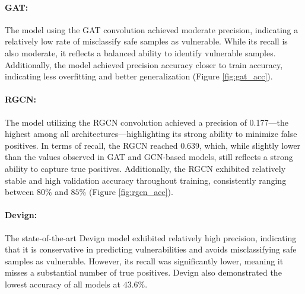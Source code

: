 \documentclass{article}
\begin{document}
\paragraph{GAT:} The model using the GAT convolution achieved moderate precision, indicating a relatively low rate of misclassify safe samples as vulnerable. While its recall is also moderate, it reflects a balanced ability to identify vulnerable samples. Additionally, the model achieved precision accuracy closer to train accuracy, indicating less overfitting and better generalization (Figure \ref{fig:gat_acc}).

\paragraph{RGCN:} The model utilizing the RGCN convolution achieved a precision of 0.177—the highest among all architectures—highlighting its strong ability to minimize false positives. In terms of recall, the RGCN reached 0.639, which, while slightly lower than the values observed in GAT and GCN-based models, still reflects a strong ability to capture true positives. Additionally, the RGCN exhibited relatively stable and high validation accuracy throughout training, consistently ranging between $80$\% and $85$\% (Figure \ref{fig:rgcn_acc}).

\paragraph{Devign:} The state-of-the-art Devign model exhibited relatively high precision, indicating that it is conservative in predicting vulnerabilities and avoids misclassifying safe samples as vulnerable. However, its recall was significantly lower, meaning it misses a substantial number of true positives. Devign also demonstrated the lowest accuracy of all models at $43.6$\%.
\end{document}
